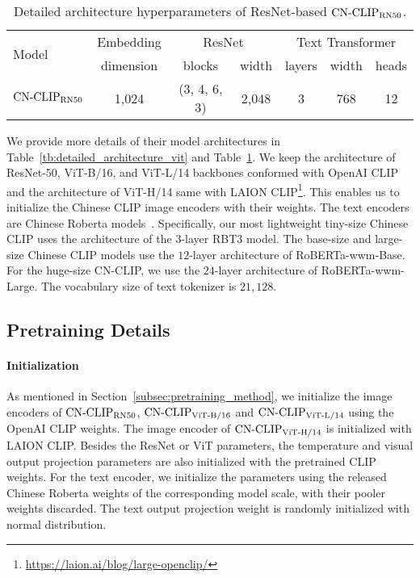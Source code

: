 \documentclass[11pt]{article}
\begin{document}
\begin{table*}[t]
\center
\small
\begin{tabular}{@{\extracolsep{\fill}}lcccccc}
\toprule
  \multirow{2}{*}{Model}
  & Embedding
  & \multicolumn{2}{c}{ResNet}
  & \multicolumn{3}{c}{Text Transformer}
  \\
  & dimension
  & blocks
  & width
  & layers
  & width
  & heads
  \\
\midrule
    $\text{CN-CLIP}\rm_{RN50}$
    & 1,024
    & (3, 4, 6, 3)
    & 2,048
    & 3
    & 768
    & 12
    \\
\bottomrule
\end{tabular}
\caption{Detailed architecture hyperparameters of ResNet-based $\text{CN-CLIP}\rm_{RN50}$.}
\label{tb:detailed_architecture_rn}
\end{table*} We provide more details of their model architectures in Table~\ref{tb:detailed_architecture_vit} and Table~\ref{tb:detailed_architecture_rn}. We keep the architecture of ResNet-50, ViT-B/16, and ViT-L/14 backbones conformed with OpenAI CLIP and the architecture of ViT-H/14 same with LAION CLIP\footnote{\url{https://laion.ai/blog/large-openclip/}}. 
This enables us to initialize the Chinese CLIP image encoders with their weights. 
The text encoders are Chinese Roberta models~\cite{wwm}. Specifically, our most lightweight tiny-size Chinese CLIP uses the architecture of the $3$-layer RBT3 model. The base-size and large-size Chinese CLIP models use the $12$-layer architecture of RoBERTa-wwm-Base. For the huge-size CN-CLIP, we use the $24$-layer architecture of RoBERTa-wwm-Large. The vocabulary size of text tokenizer is $21,128$.

\subsection{Pretraining Details}
\label{subsec:pretraining_details}

\paragraph{Initialization} As mentioned in Section~\ref{subsec:pretraining_method}, we initialize the image encoders of $\text{CN-CLIP}\rm_{RN50}$, $\text{CN-CLIP}\rm_{ViT\text{-}B/16}$ and $\text{CN-CLIP}\rm_{ViT\text{-}L/14}$ using the OpenAI CLIP weights. The image encoder of $\text{CN-CLIP}\rm_{ViT\text{-}H/14}$ is initialized with LAION CLIP. 
Besides the ResNet or ViT parameters, the temperature and visual output projection parameters are also initialized with the pretrained CLIP weights. 
For the text encoder, we initialize the parameters using the released Chinese Roberta weights of the corresponding model scale, with their pooler weights discarded. The text output projection weight is randomly initialized with normal distribution.
\end{document}
